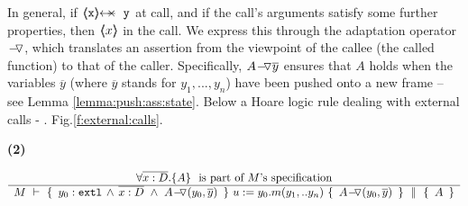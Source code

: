In general,   if $\protectedFrom{\prg{x}}{\prg{y}}$ at call, and if the call's arguments satisfy some further properties, then
$\inside {x}$ in the call.
We express this through the adaptation operator $\FIXSymbolA$, which translates an assertion from the viewpoint of the callee (the called function) to that of the caller. 
Specifically, $\PushAS y A$ ensures that $A$ holds when the variables $\overline{y}$ (where $\overline{y}$ stands for $y_1, ..., y_n$) have been pushed onto a new frame -- see Lemma \ref{lemma:push:ass:state}.
 {Below  a  Hoare logic rule  dealing with external calls - \cf. Fig.\ref{f:external:calls}.} %
 
 \begin{minipage}{.05\textwidth}
   \textbf{(2)}
\end{minipage}
\hfill
\begin{minipage}{.95\textwidth}
\begin{flushleft}
 $\inferruleNoName  
 	{ 
   	   {\TwoStatesN {\overline {x:D}} {A}}\ \   \mbox{is part of $M$'s specification}
        }
	{    \hprovesN{M} 
						{ \    { \external{y_0}} \,     \wedge \,  \overline{x:D}\  \wedge\ {\PushASLong {{(y_0,\overline {y})}}  {A}}  \ } 
						{ \ u:=y_0.m(y_1,.. y_n)\    }
						{ \   {\PushASLong {{(y_0,\overline {y})}}  A}  \ }
						{\  A \   }         }
$
\end{flushleft}
\end{minipage}

